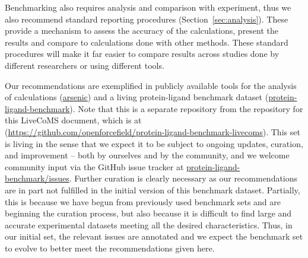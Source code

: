 \documentclass[9pt,bestpractices,pubversion]{livecoms}
\newcommand{\githubrepository}{\href{https://github.com/openforcefield/protein-ligand-benchmark-livecoms}{https://github.com/openforcefield/protein-ligand-benchmark-livecoms}}  %
\begin{document}
Benchmarking also requires analysis and comparison with experiment, thus we also recommend standard reporting procedures (Section~\ref{sec:analysis}). These provide a mechanism to assess the accuracy of the calculations, present the results and compare to calculations done with other methods. These standard procedures will make it far easier to compare results across studies done by different researchers or using different tools.

Our recommendations are exemplified in publicly available tools for the analysis of calculations (\href{http://github.com/OpenFreeEnergy/arsenic}{arsenic})
and a living protein-ligand benchmark dataset (\href{http://github.com/openforcefield/protein-ligand-benchmark}{protein-ligand-benchmark}). Note that this is a separate repository from the repository for this LiveCoMS document, which is at (\githubrepository). 
%
This set is living in the sense that we expect it to be subject to ongoing updates, curation, and improvement -- both by ourselves and by the community, and we welcome community input via the GitHub issue tracker at \href{http://github.com/openforcefield/protein-ligand-benchmark/issues}{protein-ligand-benchmark/issues}. Further curation is clearly necessary as our recommendations are in part not fulfilled in the initial version of this benchmark dataset. Partially, this is because we have begun from previously used benchmark sets and are beginning the curation process, but also because it is difficult to find large and accurate experimental datasets meeting all the desired characteristics. Thus, in our initial set, the relevant issues are annotated and we expect the benchmark set to evolve to better meet the recommendations given here.
\end{document}
